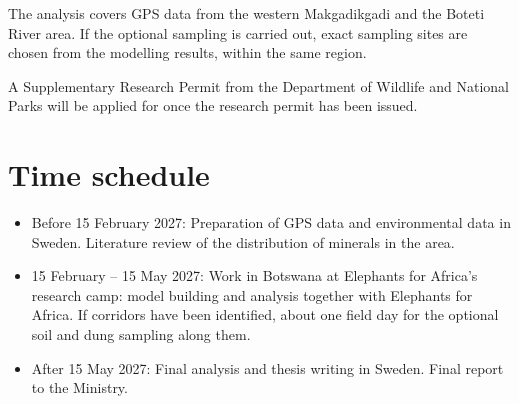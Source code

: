 \documentclass[12pt,a4paper]{article}
\begin{document}
The analysis covers GPS data from the western Makgadikgadi and the Boteti River area. If the optional sampling is carried out, exact sampling sites are chosen from the modelling results, within the same region.

A Supplementary Research Permit from the Department of Wildlife and National Parks will be applied for once the research permit has been issued.

\section{Time schedule}
\begin{itemize}
\item Before 15 February 2027: Preparation of GPS data and environmental data in Sweden. Literature review of the distribution of minerals in the area.
\item 15 February -- 15 May 2027: Work in Botswana at Elephants for Africa's research camp: model building and analysis together with Elephants for Africa. If corridors have been identified, about one field day for the optional soil and dung sampling along them.
\item After 15 May 2027: Final analysis and thesis writing in Sweden. Final report to the Ministry.
\end{itemize}

\end{document}

